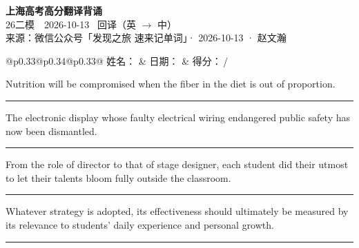 \documentclass[11pt,a4paper]{article}
\newcommand{\num}[1]{\makebox[1.9em][r]{#1.}\hspace{0.3em}}
\newcommand{\wline}{\noindent\rule{\linewidth}{0.4pt}}
\begin{document}
\pagestyle{plain}
\begin{center}
{\LARGE\bfseries 上海高考高分翻译背诵 }\\[0.25em]
{\large 26二模　2026-10-13 \quad\ 回译（英 $\to$ 中）}\\[0.35em]
{\footnotesize 来源：微信公众号「发现之旅 速来记单词」· 2026-10-13 · 赵文瀚}
\end{center}

\vspace{0.4em}
\noindent\begin{tabular}{@{}p{0.33\textwidth}@{}p{0.34\textwidth}@{}p{0.33\textwidth}@{}}
姓名：\underline{\hspace{2.0cm}} & 日期：\underline{\hspace{2.0cm}} & 得分：\underline{\hspace{1.4cm}}\,/ \\
\end{tabular}

\vspace{0.5em}

\vspace{0.8em}
\num{1}Nutrition will be compromised when the fiber in the diet is out of proportion.

\vspace{0.25em}

\wline

\num{2}The electronic display whose faulty electrical wiring endangered public safety has now been dismantled.

\vspace{0.25em}

\wline

\num{3}From the role of director to that of stage designer, each student did their utmost to let their talents bloom fully outside the classroom.

\vspace{0.25em}

\wline

\num{4}Whatever strategy is adopted, its effectiveness should ultimately be measured by its relevance to students’ daily experience and personal growth.

\vspace{0.25em}

\wline
\end{document}
